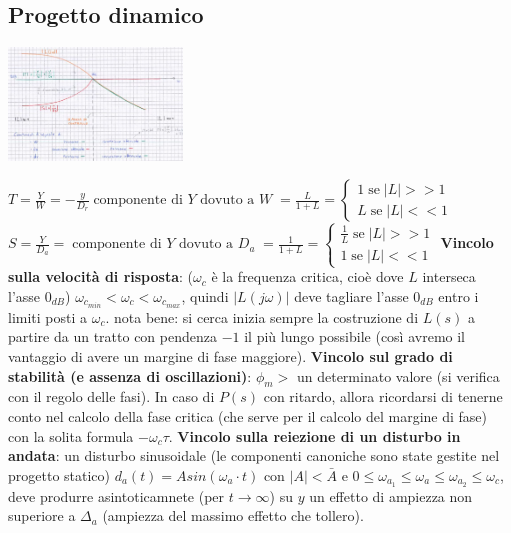 \begin{landscape}
\begin{multicols*}{2}
    \subsection{Progetto dinamico}
    \begin{center}
        \includegraphics[height=3cm]{../formulario/img3.JPG}
    \end{center}
    $T = \frac{Y}{W} = - \frac{y}{D_r}\; \text{componente di $Y$ dovuto a $W$}\; = \frac{L}{1+L} = \begin{cases}
        1 \; \text{se}\; |L| >> 1\\
        L \; \text{se}\; |L| << 1
    \end{cases}$\newline
    $S = \frac{Y}{D_a} =\; \text{componente di $Y$ dovuto a $D_a$}\; = \frac{1}{1+L} = \begin{cases}
        \frac{1}{L} \; \text{se}\; |L| >> 1\\
        1 \; \text{se}\; |L| << 1
    \end{cases}$\newline
    \newline
    \textbf{Vincolo sulla velocità di risposta}: ($\omega_c$ è la frequenza critica, cioè dove $L$ interseca l'asse $0_{dB}$) $\omega_{c_{min}} < \omega_c < \omega_{c_{max}}$, quindi $|L(j \omega)|$ deve tagliare l'asse $0_{dB}$ entro i limiti posti a $\omega_c$. \newline
    nota bene: si cerca inizia sempre la costruzione di $L(s)$ a partire da un tratto con pendenza $-1$ il più lungo possibile (così avremo il vantaggio di avere un margine di fase maggiore).\newline
    \textbf{Vincolo sul grado di stabilità (e assenza di oscillazioni)}: $\phi_m > $ un determinato valore (si verifica con il regolo delle fasi). In caso di $P(s)$ con ritardo, allora ricordarsi di tenerne conto nel calcolo della fase critica (che serve per il calcolo del margine di fase) con la solita formula $-\omega_c \tau$.\newline
    \textbf{Vincolo sulla reiezione di un disturbo in andata}: un disturbo sinusoidale (le componenti canoniche sono state gestite nel progetto statico) $d_a(t) = A sin (\omega_a \cdot  t)$ con $|A| < \bar{A}$ e $0 \leq \omega_{a_1} \leq \omega_a \leq \omega_{a_2} \leq \omega_c$, deve produrre asintoticamnete (per $t \rightarrow \infty$) su $y$ un effetto di ampiezza non superiore a $\Delta_a$ (ampiezza del massimo effetto che tollero).\newline

\end{multicols*}
\end{landscape}
